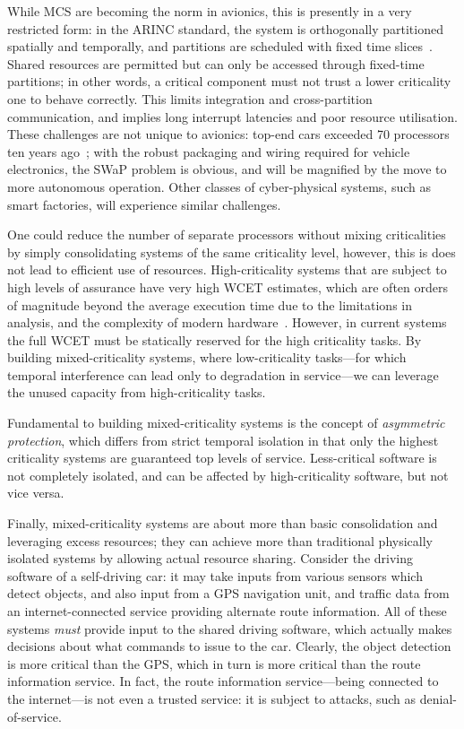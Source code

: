 While MCS are becoming the norm in avionics, this is presently in a very restricted form: in the
ARINC standard, the system
is orthogonally partitioned spatially and temporally, and partitions are scheduled with fixed time
slices~\citep{ARINC653}. Shared resources are permitted but can only be accessed through fixed-time
partitions; in other words, a critical component must not
trust a lower criticality one to behave correctly. This limits integration and cross-partition
communication, and implies long interrupt latencies and poor resource utilisation. 
These challenges are not unique to avionics: top-end cars exceeded 70 processors ten years
ago~\citep{Broy_KPS_07}; with the robust packaging and wiring required for vehicle electronics, the
SWaP problem is obvious, and will be magnified by the move to more autonomous operation. Other
classes of cyber-physical systems, such as smart factories, will experience similar challenges.

One could reduce the number of separate processors without mixing criticalities by simply consolidating 
systems of the same criticality level, however, this is does not lead to efficient use of resources. 
High-criticality systems that are subject to high levels of assurance have very high \gls{WCET} estimates,
which are often orders of magnitude beyond the average execution time due to the limitations in analysis,
and the complexity of modern hardware~\citep{Wilhelm_EEHTWBFHMMPPSS_08}. However, in current systems the full \gls{WCET} must be
statically reserved for the high criticality tasks. By building mixed-criticality systems, where
low-criticality tasks---for which temporal interference can lead only to degradation in service---we can
leverage the unused capacity from high-criticality tasks. 

Fundamental to building mixed-criticality systems is the concept of \emph{asymmetric protection},
which differs from strict temporal isolation in that only the highest criticality systems are
guaranteed top levels of service. Less-critical software is not completely isolated, and can be
affected by high-criticality software, but not vice versa. 

Finally, mixed-criticality systems are about more than basic consolidation and leveraging excess
resources; they can achieve more
than traditional physically isolated systems by allowing actual resource sharing. 
Consider the driving software of a self-driving car: it may take inputs from various sensors
which detect objects, and also input from a \gls{GPS} navigation unit, and traffic data from an
internet-connected
service providing alternate route information. All of these systems \emph{must} provide input to the
shared driving software, which actually makes decisions about what commands to issue to the car.
Clearly, the object detection is more critical than the \gls{GPS}, which in turn is more critical than the
route information service. In fact, the route information service---being connected to the
internet---is not even a trusted service: it is subject to attacks, such as denial-of-service. 

